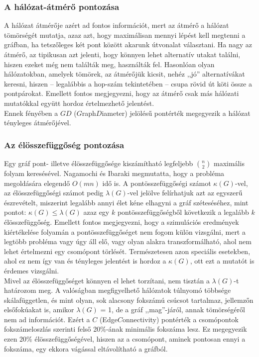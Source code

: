     \subsubsection{A hálózat-átmérő pontozása}
    A hálózat átmérője azért ad fontos információt, mert az átmérő a hálózat tömörségét mutatja, azaz azt, hogy maximálisan mennyi lépést kell megtenni a gráfban, ha tetszőleges két pont között akarunk útvonalat választani. Ha nagy az átmérő, az tipikusan azt jelenti, hogy könnyen lehet alternatív utakat találni, hiszen ezeket még nem találták meg, használták fel. Hasonlóan olyan hálózatokban, amelyek tömörek, az átmérőjük kicsit, nehéz ,,jó'' alternatívákat keresni, hiszen -- legalábbis a hop-szám tekintetében -- csupa rövid út köti össze a pontpárokat. Emellett fontos megjegyezni, hogy az átmérő csak más hálózati mutatókkal együtt hordoz értelmezhető jelentést.\\
    Ennek fényében a $GD$ ($G$raph$D$iameter) jelölésű pontérték megegyezik a hálózat tényleges átmérőjével.

    \subsubsection{Az élösszefüggőség pontozása}\label{elossze}
    Egy gráf pont- illetve élösszefüggősége kiszámítható legfeljebb $\binom{n}{2}$ maximális folyam keresésével. Nagamochi és Ibaraki megmutatta, hogy a probléma megoldására elegendő $O(mn)$ idő is\cite{Nagamochi96}. A pontösszefüggőségi számot $\kappa(G)$-vel, az élösszefüggőségi számot pedig $\lambda(G)$-vel jelölve felírhatjuk azt az egyszerű észrevételt, miszerint legalább annyi élet kéne elhagyni a gráf széteséséhez, mint pontot: $\kappa(G) \leq \lambda(G)$ azaz egy $k$ pontösszefüggőségből következik a legalább $k$ élösszefüggőség. Emellett fontos megjegyezni, hogy a szimulációs eredmények kiértékelése folyamán a pontösszefüggőséget nem fogom külön vizsgálni, mert a legtöbb probléma vagy úgy áll elő, vagy olyan alakra transzformálható, ahol nem lehet értelmezni egy csomópont törlését. Természetesen azon speciális esetekben, ahol ez nem így van és tényleges jelentést is hordoz a $\kappa(G)$, ott ezt a mutatót is érdemes vizsgálni.\\

    Mivel az élösszefüggőséget könnyen el lehet torzítani, nem tisztán a $\lambda(G)$-t határozom meg. A valóságban megfigyelhető hálózatok túlnyomó többsége skálafüggetlen, és mint olyan, sok alacsony fokszámú csúcsot tartalmaz, jellemzőn elsőfokúakat is, amikor $\lambda(G)$ = 1, de a gráf ,,mag''-járól, annak tömörségéről nem ad információt. Ezért a $C$ (Edge$C$onnectivity) pontérték a csomópontok fokszámeloszlás szerinti felső 20\%-ának minimális fokszáma lesz. Ez megegyezik ezen 20\% élösszefüggőségével, hiszen az a csomópont, aminek pontosan ennyi a fokszáma, egy ekkora vágással eltávolítható a gráfból.

